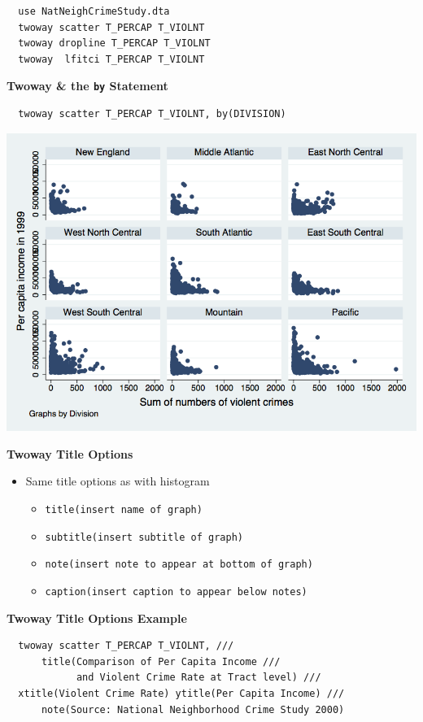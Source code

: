 \documentclass[]{book}
\providecommand{\tightlist}{%
  \setlength{\itemsep}{0pt}\setlength{\parskip}{0pt}}
\begin{document}
\begin{verbatim}
  use NatNeighCrimeStudy.dta
  twoway scatter T_PERCAP T_VIOLNT
  twoway dropline T_PERCAP T_VIOLNT
  twoway  lfitci T_PERCAP T_VIOLNT
\end{verbatim}

\textbf{Twoway \& the \texttt{by} Statement}

\begin{verbatim}
  twoway scatter T_PERCAP T_VIOLNT, by(DIVISION)
\end{verbatim}

\includegraphics{Stata/StataModGraph/images/twowayby.png}

\textbf{Twoway Title Options}

\begin{itemize}
\tightlist
\item
  Same title options as with histogram

  \begin{itemize}
  \tightlist
  \item
    \texttt{title(insert\ name\ of\ graph)}
  \item
    \texttt{subtitle(insert\ subtitle\ of\ graph)}
  \item
    \texttt{note(insert\ note\ to\ appear\ at\ bottom\ of\ graph)}
  \item
    \texttt{caption(insert\ caption\ to\ appear\ below\ notes)}
  \end{itemize}
\end{itemize}

\textbf{Twoway Title Options Example}

\begin{verbatim}
  twoway scatter T_PERCAP T_VIOLNT, ///
      title(Comparison of Per Capita Income ///
            and Violent Crime Rate at Tract level) ///
  xtitle(Violent Crime Rate) ytitle(Per Capita Income) ///
      note(Source: National Neighborhood Crime Study 2000) 
\end{verbatim}
\end{document}
